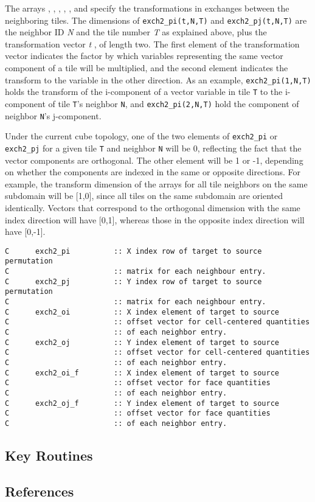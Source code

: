 The arrays ,
, ,
, , and
 specify the transformations in
exchanges between the neighboring tiles.  The dimensions of
\texttt{exch2\_pi(t,N,T)} and \texttt{exch2\_pj(t,N,T)} are the
neighbor ID \textit{N} and the tile number \textit{T} as explained
above, plus the transformation vector {\em t }, of length two.  The
first element of the transformation vector indicates the factor by
which variables representing the same vector component of a tile will
be multiplied, and the second element indicates the transform to the
variable in the other direction.  As an example,
\texttt{exch2\_pi(1,N,T)} holds the transform of the i-component of a
vector variable in tile \texttt{T} to the i-component of tile
\texttt{T}'s neighbor \texttt{N}, and \texttt{exch2\_pi(2,N,T)} hold
the component of neighbor \texttt{N}'s j-component.

Under the current cube topology, one of the two elements of
\texttt{exch2\_pi} or \texttt{exch2\_pj} for a given tile \texttt{T}
and neighbor \texttt{N} will be 0, reflecting the fact that the vector
components are orthogonal.  The other element will be 1 or -1,
depending on whether the components are indexed in the same or
opposite directions.  For example, the transform dimension of the
arrays for all tile neighbors on the same subdomain will be [1,0],
since all tiles on the same subdomain are oriented identically.
Vectors that correspond to the orthogonal dimension with the same
index direction will have [0,1], whereas those in the opposite index
direction will have [0,-1].


{\footnotesize
\begin{verbatim}
C      exch2_pi          :: X index row of target to source permutation 
C                        :: matrix for each neighbour entry.            
C      exch2_pj          :: Y index row of target to source permutation 
C                        :: matrix for each neighbour entry.            
C      exch2_oi          :: X index element of target to source 
C                        :: offset vector for cell-centered quantities  
C                        :: of each neighbor entry.                     
C      exch2_oj          :: Y index element of target to source 
C                        :: offset vector for cell-centered quantities  
C                        :: of each neighbor entry.                     
C      exch2_oi_f        :: X index element of target to source 
C                        :: offset vector for face quantities           
C                        :: of each neighbor entry.                     
C      exch2_oj_f        :: Y index element of target to source 
C                        :: offset vector for face quantities           
C                        :: of each neighbor entry.                     
\end{verbatim}
}



\subsection{Key Routines}



\subsection{References}
